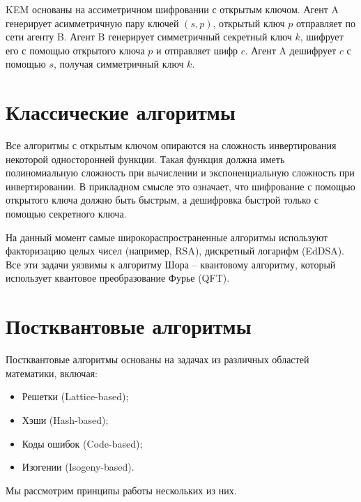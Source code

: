 KEM основаны на ассиметричном шифровании с открытым ключом. Агент A генерирует асимметричную пару ключей $(s, p)$, открытый ключ $p$ отправляет по сети агенту B. Агент B генерирует симметричный секретный ключ $k$, шифрует его с помощью открытого ключа $p$ и отправляет шифр $c$. Агент A дешифрует $c$ с помощью $s$, получая симметричный ключ $k$.

\section{Классические алгоритмы}

Все алгоритмы с открытым ключом опираются на сложность инвертирования некоторой односторонней функции. Такая функция должна иметь полиномиальную сложность при вычислении и экспоненциальную сложность при инвертировании. В прикладном смысле это означает, что шифрование с помощью открытого ключа должно быть быстрым, а дешифровка быстрой только с помощью секретного ключа.

На данный момент самые широкораспространенные алгоритмы используют факторизацию целых чисел (например, RSA), дискретный логарифм (EdDSA). Все эти задачи уязвимы к алгоритму Шора -- квантовому алгоритму, который использует квантовое преобразование Фурье (QFT).

\section{Постквантовые алгоритмы}

Постквантовые алгоритмы основаны на задачах из различных областей математики, включая:
\begin{itemize}
	\item Решетки (Lattice-based);
	\item Хэши (Hash-based);
	\item Коды ошибок (Code-based);
	\item Изогении (Isogeny-based).
\end{itemize}

Мы рассмотрим принципы работы нескольких из них.

\endinput